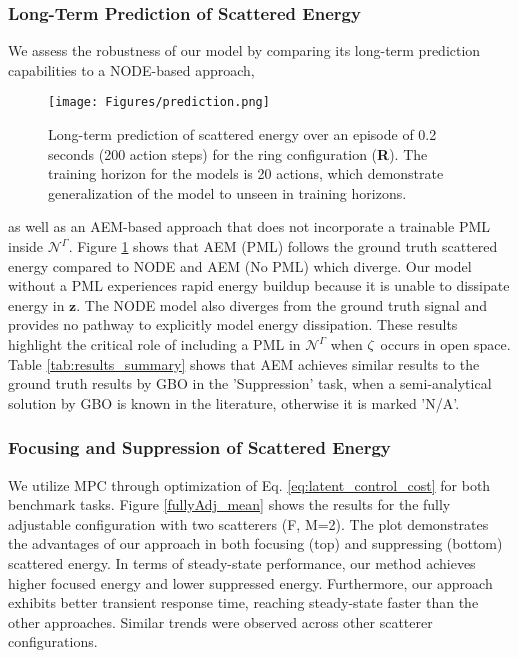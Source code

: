 \subsubsection{Long-Term Prediction of Scattered Energy}
We assess the robustness of our model by comparing its long-term prediction capabilities to a NODE-based approach, \begin{figure}%
\texttt{[image: Figures/prediction.png]}
\caption{Long-term prediction of scattered energy over an episode of 0.2 seconds (200 action steps) for the ring configuration (\textbf{R}). The training horizon for the models is 20 actions, which demonstrate generalization of the model to unseen in training horizons.}\label{prediction_plot}
\end{figure} as well as an AEM-based approach that does not incorporate a trainable PML inside $\mathcal{N}^\Gamma$. Figure \ref{prediction_plot} shows that AEM (PML) follows the ground truth scattered energy compared to NODE and AEM (No PML) which diverge. Our model without a PML experiences rapid energy buildup because it is unable to dissipate energy in $\mathbf{z}$. The NODE model also diverges from the ground truth signal and provides no pathway to explicitly model energy dissipation. These results highlight the critical role of including a PML in $\mathcal{N}^\Gamma$ when $\zeta$ occurs in open space. Table \ref{tab:results_summary} shows that AEM achieves similar results to the ground truth results by GBO in the 'Suppression' task, when a semi-analytical solution by GBO is known in the literature, otherwise it is marked 'N/A'.\\

\subsubsection{Focusing and Suppression of Scattered Energy}
We utilize MPC through optimization of Eq. \eqref{eq:latent_control_cost} for both benchmark tasks. Figure \ref{fullyAdj_mean} shows the results for the fully adjustable configuration with two scatterers (F, M=2). The plot demonstrates the advantages of our approach in both focusing (top) and suppressing (bottom) scattered energy. In terms of steady-state performance, our method achieves higher focused energy and lower suppressed energy. Furthermore, our approach exhibits better transient response time, reaching steady-state faster than the other approaches. Similar trends were observed across other scatterer configurations.

